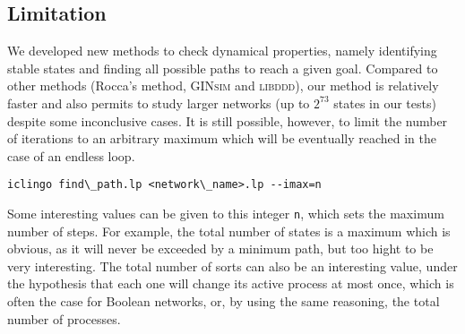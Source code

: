 \subsection{Limitation}

We developed new methods to check dynamical properties,
namely identifying stable states and finding all possible paths to reach a given goal.
Compared to other methods (Rocca's method, \textsc{GINsim} and \textsc{libddd}),
our method is relatively faster and also permits to study larger networks
(up to $2^{73}$ states in our tests) despite some inconclusive cases.
%
It is still possible, however, to limit the number of iterations to an arbitrary
maximum which will be eventually reached in the case of an endless loop.
\begin{lstlisting}[numbers=none]
iclingo find\_path.lp <network\_name>.lp --imax=n
\end{lstlisting}
Some interesting values can be given to this integer \texttt{n},
which sets the maximum number of steps.
For example, the total number of states is a maximum which is obvious,
as it will never be exceeded by a minimum path,
but too hight to be very interesting.
The total number of sorts can also be an interesting value,
under the hypothesis that each one will change its active process at most once,
which is often the case for Boolean networks,
or, by using the same reasoning, the total number of processes.
%
